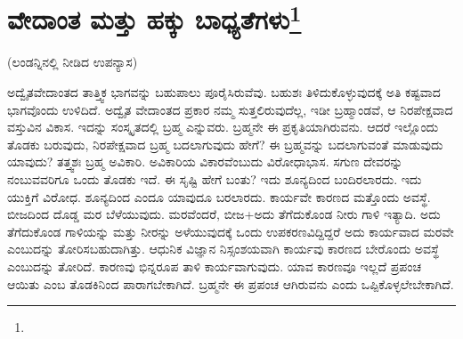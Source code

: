 
\chapter[ವೇದಾಂತ ಮತ್ತು ಹಕ್ಕು ಬಾಧ್ಯತೆಗಳು]{ವೇದಾಂತ ಮತ್ತು ಹಕ್ಕು ಬಾಧ್ಯತೆಗಳು\protect\footnote{}}

\begin{center}
(ಲಂಡನ್ನಿನಲ್ಲಿ ನೀಡಿದ ಉಪನ್ಯಾಸ)
\end{center}

ಅದ್ವೈತವೇದಾಂತದ ತಾತ್ತ್ವಿಕ ಭಾಗವನ್ನು ಬಹುಪಾಲು ಪೂರೈಸಿರುವೆವು. ಬಹುಶಃ ತಿಳಿದುಕೊಳ್ಳುವುದಕ್ಕೆ ಅತಿ ಕಷ್ಟವಾದ ಭಾಗವೊಂದು ಉಳಿದಿದೆ. ಅದ್ವೈತ ವೇದಾಂತದ ಪ್ರಕಾರ ನಮ್ಮ ಸುತ್ತಲಿರುವುದೆಲ್ಲ, ಇಡೀ ಬ್ರಹ್ಮಾಂಡವೆ, ಆ ನಿರಪೇಕ್ಷವಾದ ವಸ್ತುವಿನ ವಿಕಾಸ. ಇದನ್ನು ಸಂಸ್ಕೃತದಲ್ಲಿ ಬ್ರಹ್ಮ ಎನ್ನುವರು. ಬ್ರಹ್ಮನೇ ಈ ಪ್ರಕೃತಿಯಾಗಿರುವನು. ಆದರೆ ಇಲ್ಲೊಂದು ತೊಡಕು ಬರುವುದು, ನಿರಪೇಕ್ಷವಾದ ಬ್ರಹ್ಮ ಬದಲಾಗುವುದು ಹೇಗೆ? ಈ ಬ್ರಹ್ಮವನ್ನು ಬದಲಾಗುವಂತೆ ಮಾಡುವುದು ಯಾವುದು? ತತ್ತ್ವಶಃ ಬ್ರಹ್ಮ ಅವಿಕಾರಿ. ಅವಿಕಾರಿಯ ವಿಕಾರವೆಂಬುದು ವಿರೋಧಾಭಾಸ. ಸಗುಣ ದೇವರನ್ನು ನಂಬುವವರಿಗೂ ಒಂದು ತೊಡಕು ಇದೆ. ಈ ಸೃಷ್ಟಿ ಹೇಗೆ ಬಂತು? ಇದು ಶೂನ್ಯದಿಂದ ಬಂದಿರಲಾರದು. ಇದು ಯುಕ್ತಿಗೆ ವಿರೋಧ. ಶೂನ್ಯದಿಂದ ಎಂದೂ ಯಾವುದೂ ಬರಲಾರದು. ಕಾರ್ಯವೇ ಕಾರಣದ ಮತ್ತೊಂದು ಅವಸ್ಥೆ. ಬೀಜದಿಂದ ದೊಡ್ಡ ಮರ ಬೆಳೆಯುವುದು. ಮರವೆಂದರೆ, ಬೀಜ+ಅದು ತೆಗೆದುಕೊಂಡ ನೀರು ಗಾಳಿ ಇತ್ಯಾದಿ. ಅದು ತೆಗೆದುಕೊಂಡ ಗಾಳಿಯನ್ನು ಮತ್ತು ನೀರನ್ನು ಅಳೆಯುವುದಕ್ಕೆ ಒಂದು ಉಪಕರಣವಿದ್ದಿದ್ದರೆ ಅದು ಕಾರ್ಯವಾದ ಮರವೇ ಎಂಬುದನ್ನು ತೋರಿಸಬಹುದಾಗಿತ್ತು. ಆಧುನಿಕ ವಿಜ್ಞಾನ ನಿಸ್ಸಂಶಯವಾಗಿ ಕಾರ್ಯವು ಕಾರಣದ ಬೇರೊಂದು ಅವಸ್ಥೆ ಎಂಬುದನ್ನು ತೋರಿದೆ. ಕಾರಣವು ಭಿನ್ನರೂಪ ತಾಳಿ ಕಾರ್ಯವಾಗುವುದು. ಯಾವ ಕಾರಣವೂ ಇಲ್ಲದೆ ಪ್ರಪಂಚ ಆಯಿತು ಎಂಬ ತೊಡಕಿನಿಂದ ಪಾರಾಗಬೇಕಾಗಿದೆ. ಬ್ರಹ್ಮನೇ ಈ ಪ್ರಪಂಚ ಆಗಿರುವನು ಎಂದು ಒಪ್ಪಿಕೊಳ್ಳಲೇಬೇಕಾಗಿದೆ.

